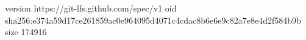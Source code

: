 version https://git-lfs.github.com/spec/v1
oid sha256:e374a59d17ce261859ac0e964095d4071c4cdac8b6e6e9c82a7e8e4d2f584b9b
size 174916
